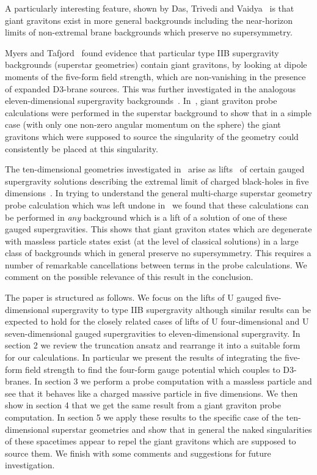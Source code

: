 \documentclass[a4paper,12pt]{article}
\begin{document}
A particularly interesting feature, shown by
Das, Trivedi and Vaidya~\cite{Das:2000ab} is that giant gravitons exist in
more general backgrounds including the near-horizon limits of non-extremal brane backgrounds which
preserve no supersymmetry.

Myers and Tafjord~\cite{Myers:2001aq} found evidence that particular type IIB
supergravity backgrounds (superstar geometries) contain giant gravitons, by
looking at dipole moments
of the five-form field strength, which are non-vanishing in the presence of expanded D3-brane sources. This was further investigated in the
analogous eleven-dimensional supergravity backgrounds~\cite{Balasubramanian:2001dx, Leblond:2001gn}. In~\cite{Leblond:2001gn}, giant graviton probe calculations were performed in the superstar background to show that in a simple case (with only one non-zero angular momentum on the sphere) the giant gravitons which were supposed to source the singularity of the geometry could consistently be placed at this singularity.

The ten-dimensional geometries investigated in~\cite{Myers:2001aq} arise as
lifts~\cite{Cvetic:1999xp} of certain gauged supergravity solutions describing
the extremal limit of charged black-holes in five
dimensions~\cite{Behrndt:1998ns, Behrndt:1998jd}. In trying to understand the
general multi-charge superstar geometry probe calculation which was left undone
in~\cite{Leblond:2001gn} we found that these calculations can be performed in
{\it any} background which is a lift of a solution of one of these gauged
supergravities. This shows that giant graviton states which are degenerate with massless particle states exist (at the level of classical solutions) in a large class of backgrounds which in general preserve no supersymmetry. This requires a number of remarkable cancellations between terms in the probe calculations. We comment on the possible relevance of this result in the conclusion.

The paper is structured as follows. We focus on the lifts of U\coordHE{}
gauged five-dimensional \coordHE{} supergravity to type IIB supergravity
although similar results can be expected to hold for the closely related cases
of lifts of U\coordHE{} four-dimensional and U\coordHE{} seven-dimensional gauged
supergravities to
eleven-dimensional supergravity. In section 2 we review the truncation ansatz
and rearrange it into a suitable form for our calculations. In particular we
present the results of integrating the five-form field strength to find the
four-form gauge potential which couples to D3-branes. In section 3 we perform
a probe computation with a massless particle and see that it behaves like a
charged massive particle in five dimensions. We then show in section 4 that we
get the same result from a giant graviton probe computation. In section 5 we apply these results to the specific case of the ten-dimensional superstar geometries and show that in general the naked singularities of these spacetimes appear to repel the giant gravitons which are supposed to source them. We finish with some comments and suggestions for future investigation.
\end{document}
